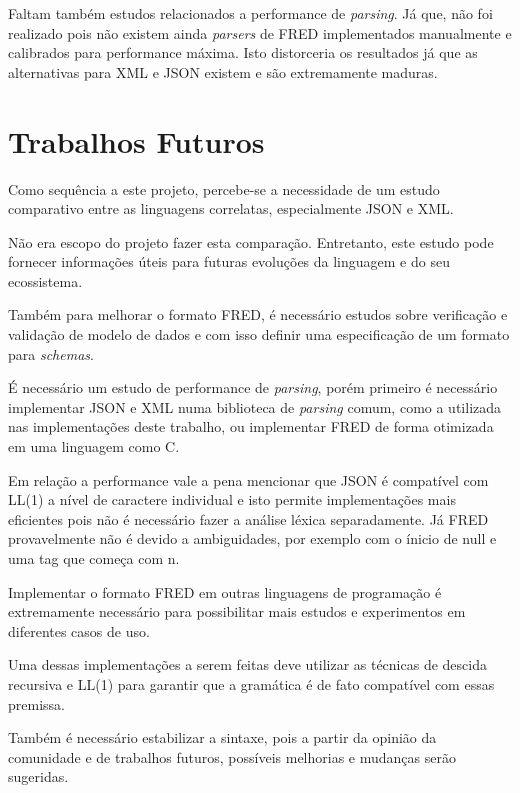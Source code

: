 Faltam também estudos relacionados a performance de \textit{parsing}. Já que, não foi 
realizado pois não existem ainda \textit{parsers} de FRED implementados manualmente e calibrados 
para performance máxima. Isto distorceria os resultados já que as alternativas para XML e JSON
existem e são extremamente maduras.

\section{Trabalhos Futuros}

Como sequência a este projeto, percebe-se a necessidade de
um estudo comparativo entre as linguagens correlatas, especialmente JSON e XML.

Não era escopo do projeto fazer esta comparação. Entretanto,
este estudo pode fornecer informações úteis para futuras evoluções da linguagem
e do seu ecossistema.

Também para melhorar o formato FRED, é necessário estudos sobre verificação e 
validação de modelo de dados e com isso definir uma especificação 
de um formato para \textit{schemas}.

É necessário um estudo de performance de \textit{parsing}, porém primeiro
é necessário implementar JSON e XML numa biblioteca de \textit{parsing} comum,
como a utilizada nas implementações deste trabalho, ou implementar FRED 
de forma otimizada em uma linguagem como C.

Em relação a performance vale a pena mencionar que JSON é compatível com LL(1) a 
nível de caractere individual e isto permite implementações mais eficientes pois não 
é necessário fazer a análise léxica separadamente. Já FRED provavelmente não é devido 
a ambiguidades, por exemplo com o ínicio de null e uma tag que começa com n.

Implementar o formato FRED em outras linguagens de programação
é extremamente necessário para possibilitar mais estudos e experimentos
em diferentes casos de uso. 

Uma dessas implementações a serem feitas deve utilizar as 
técnicas de descida recursiva e  LL(1) para garantir 
que a gramática é de fato compatível com essas premissa.

Também é necessário estabilizar a sintaxe, pois a partir da opinião
da comunidade e de trabalhos futuros, possíveis melhorias e mudanças serão
sugeridas.
